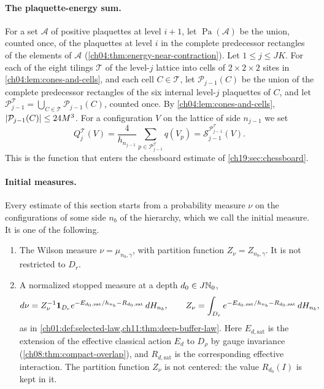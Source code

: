 \paragraph{The plaquette-energy sum.}
For a set $\mathcal A$ of positive plaquettes at level $i+1$, let $\operatorname{Pa}(\mathcal A)$ be the union, counted once, of the plaquettes at level $i$ in the complete predecessor rectangles of the elements of $\mathcal A$ (\cref{ch04:thm:energy-near-contraction}). Let $1\le j\le JK$. For each of the eight tilings $\mathcal T$ of the level-$j$ lattice into cells of $2\times2\times2$ sites in \cref{ch04:lem:cones-and-cells}, and each cell $C\in\mathcal T$, let $\mathcal P_{j-1}(C)$ be the union of the complete predecessor rectangles of the six internal level-$j$ plaquettes of $C$, and let $\mathcal P_{j-1}^{\mathcal T}=\bigcup_{C\in\mathcal T}\mathcal P_{j-1}(C)$, counted once. By \cref{ch04:lem:cones-and-cells}, $\lvert \mathcal P_{j-1}(C)\rvert\le24M^3$. For a configuration $V$ on the lattice of side $n_{j-1}$ we set
\begin{equation}\label{ch19:eq:cell-source}
 Q_j^{\mathcal T}(V)=\frac4{h_{n_{j-1}}}\sum_{p\in\mathcal P_{j-1}^{\mathcal T}}q(V_p)
 =\mathcal S_{j-1}^{\mathcal P_{j-1}^{\mathcal T}}(V).
\end{equation}
This is the function that enters the chessboard estimate of \cref{ch19:sec:chessboard}.

\paragraph{Initial measures.}
Every estimate of this section starts from a probability measure $\nu$ on the configurations of some side $n_b$ of the hierarchy, which we call the initial measure. It is one of the following.
\begin{enumerate}
\item The Wilson measure $\nu=\mu_{n_b,\gamma}$, with partition function $Z_\nu=Z_{n_b,\gamma}$. It is not restricted to $D_r$.
\item A normalized stopped measure at a depth $d_0\in J\mathbb N_0$,
\[
 d\nu=Z_\nu^{-1}\mathbf 1_{D_r}e^{-E_{d_0,\mathrm{sat}}/h_{n_b}-R_{d_0,\mathrm{sat}}}\,dH_{n_b},
 \qquad
 Z_\nu=\int_{D_r}e^{-E_{d_0,\mathrm{sat}}/h_{n_b}-R_{d_0,\mathrm{sat}}}\,dH_{n_b},
\]
as in \cref{ch01:def:selected-law,ch11:thm:deep-buffer-law}. Here $E_{d,\mathrm{sat}}$ is the extension of the effective classical action $E_d$ to $D_\rho$ by gauge invariance (\cref{ch08:thm:compact-overlap}), and $R_{d,\mathrm{sat}}$ is the corresponding effective interaction. The partition function $Z_\nu$ is not centered: the value $R_{d_0}(I)$ is kept in it.
\end{enumerate}

